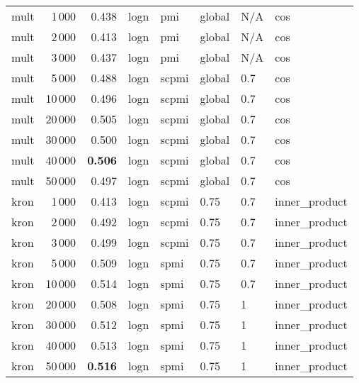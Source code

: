 \begin{tabular}{lrrlllll}
    mult &            1\,000 &  0.438 &  logn &    pmi &  global &  N/A &            cos \\
    mult &            2\,000 &  0.413 &  logn &    pmi &  global &  N/A &            cos \\
    mult &            3\,000 &  0.437 &  logn &    pmi &  global &  N/A &            cos \\
    mult &            5\,000 &  0.488 &  logn &  scpmi &  global &  0.7 &            cos \\
    mult &           10\,000 &  0.496 &  logn &  scpmi &  global &  0.7 &            cos \\
    mult &           20\,000 &  0.505 &  logn &  scpmi &  global &  0.7 &            cos \\
    mult &           30\,000 &  0.500 &  logn &  scpmi &  global &  0.7 &            cos \\
    mult &           40\,000 &  \textbf{0.506} &  logn &  scpmi &  global &  0.7 &            cos \\
    mult &           50\,000 &  0.497 &  logn &  scpmi &  global &  0.7 &            cos \\ \addlinespace
    kron &            1\,000 &  0.413 &  logn &  scpmi &    0.75 &  0.7 &  inner\_product \\
    kron &            2\,000 &  0.492 &  logn &  scpmi &    0.75 &  0.7 &  inner\_product \\
    kron &            3\,000 &  0.499 &  logn &  scpmi &    0.75 &  0.7 &  inner\_product \\
    kron &            5\,000 &  0.509 &  logn &   spmi &    0.75 &  0.7 &  inner\_product \\
    kron &           10\,000 &  0.514 &  logn &   spmi &    0.75 &  0.7 &  inner\_product \\
    kron &           20\,000 &  0.508 &  logn &   spmi &    0.75 &    1 &  inner\_product \\
    kron &           30\,000 &  0.512 &  logn &   spmi &    0.75 &    1 &  inner\_product \\
    kron &           40\,000 &  0.513 &  logn &   spmi &    0.75 &    1 &  inner\_product \\
    kron &           50\,000 &  \textbf{0.516} &  logn &   spmi &    0.75 &    1 &  inner\_product \\
\bottomrule
\end{tabular}
